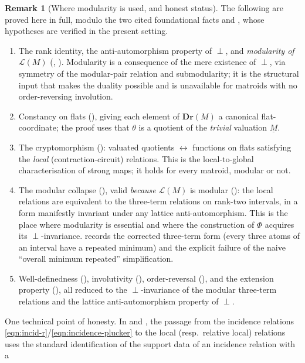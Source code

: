 \documentclass{article}
\theoremstyle{definition}
\newtheorem{remark}[theorem]{Remark}
\newcommand{\Dr}{\mathbf{Dr}}
\newcommand{\cLL}{\mathcal{L}}
\begin{document}
\begin{remark}[Where modularity is used, and honest status]\label{rmk:honest}
The following are proved here in full, modulo the two cited foundational facts 
and , whose hypotheses are verified in the present setting.
\begin{enumerate}
\item The rank identity, the anti-automorphism property of $\perp$, and \emph{modularity of
$\cLL(M)$} (, ). Modularity is a consequence of the mere existence of
$\perp$, via symmetry of the modular-pair relation and submodularity; it is the structural input that
makes the duality possible and is unavailable for matroids with no order-reversing involution.
\item Constancy on flats (), giving each element of $\Dr(M)$ a canonical
flat-coordinate; the proof uses that $\theta$ is a quotient of the \emph{trivial} valuation
$\underline M$.
\item The cryptomorphism (): valuated quotients $\leftrightarrow$ functions on flats
satisfying the \emph{local} (contraction-circuit) relations. This is the local-to-global
characterisation of strong maps; it holds for every matroid, modular or not.
\item The modular collapse (), valid \emph{because} $\cLL(M)$ is modular
(): the local relations are equivalent to the three-term relations on
rank-two intervals, in a form manifestly invariant under any lattice anti-automorphism. This is the
place where modularity is essential and where the construction of $\Phi$ acquires its
$\perp$-invariance.  records the corrected three-term form (every three atoms of an
interval have a repeated minimum) and the explicit failure of the naive ``overall minimum repeated''
simplification.
\item Well-definedness (), involutivity (), order-reversal
(), and the extension property (), all reduced to the
$\perp$-invariance of the modular three-term relations and the lattice anti-automorphism property of
$\perp$.
\end{enumerate}
One technical point of honesty. In  and , the passage from the
incidence relations \eqref{eqn:incid-r}/\eqref{eqn:incidence-plucker} to the local (resp.\ relative
local) relations uses the standard identification of the support data of an incidence relation with a

\end{remark}
\end{document}
